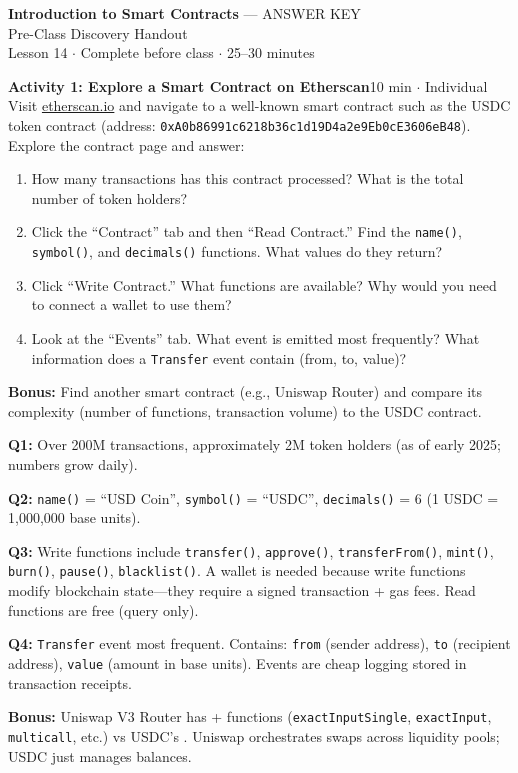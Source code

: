\documentclass[11pt,a4paper]{article}
\newcommand{\activitybox}[3]{%
  \noindent\colorbox{mllavender4}{\parbox{\dimexpr\linewidth-2\fboxsep}{%
    \textbf{\color{mlpurple}#1}\hfill\textcolor{mlgray}{\small #2}\\[2pt]#3%
  }}\par\vspace{4pt}%
}
\begin{document}
\begin{center}
{\LARGE\color{mlpurple}\textbf{Introduction to Smart Contracts} \textcolor{mlred}{--- ANSWER KEY}}\\[4pt]
{\large\color{mlblue}Pre-Class Discovery Handout}\\[2pt]
{\small\color{mlgray}Lesson 14 $\cdot$ Complete before class $\cdot$ 25--30 minutes}
\end{center}
\vspace{4pt}

\activitybox{Activity 1: Explore a Smart Contract on Etherscan}{10 min $\cdot$ Individual}{%
Visit \href{https://etherscan.io}{etherscan.io} and navigate to a well-known smart contract such as the USDC token contract (address: \texttt{0xA0b86991c6218b36c1d19D4a2e9Eb0cE3606eB48}). Explore the contract page and answer:
\begin{enumerate}
\item How many transactions has this contract processed? What is the total number of token holders?
\item Click the ``Contract'' tab and then ``Read Contract.'' Find the \texttt{name()}, \texttt{symbol()}, and \texttt{decimals()} functions. What values do they return?
\item Click ``Write Contract.'' What functions are available? Why would you need to connect a wallet to use them?
\item Look at the ``Events'' tab. What event is emitted most frequently? What information does a \texttt{Transfer} event contain (from, to, value)?
\end{enumerate}
\textbf{Bonus:} Find another smart contract (e.g., Uniswap Router) and compare its complexity (number of functions, transaction volume) to the USDC contract.
}

\begin{answerbox}
\small
\textbf{Q1:} Over 200M transactions, approximately 2M token holders (as of early 2025; numbers grow daily).

\textbf{Q2:} \texttt{name()} = ``USD Coin'', \texttt{symbol()} = ``USDC'', \texttt{decimals()} = 6 (1 USDC = 1,000,000 base units).

\textbf{Q3:} Write functions include \texttt{transfer()}, \texttt{approve()}, \texttt{transferFrom()}, \texttt{mint()}, \texttt{burn()}, \texttt{pause()}, \texttt{blacklist()}. A wallet is needed because write functions modify blockchain state---they require a signed transaction + gas fees. Read functions are free (query only).

\textbf{Q4:} \texttt{Transfer} event most frequent. Contains: \texttt{from} (sender address), \texttt{to} (recipient address), \texttt{value} (amount in base units). Events are cheap logging stored in transaction receipts.

\textbf{Bonus:} Uniswap V3 Router has + functions (\texttt{exactInputSingle}, \texttt{exactInput}, \texttt{multicall}, etc.) vs USDC's . Uniswap orchestrates swaps across liquidity pools; USDC just manages balances.
\end{answerbox}
\end{document}

